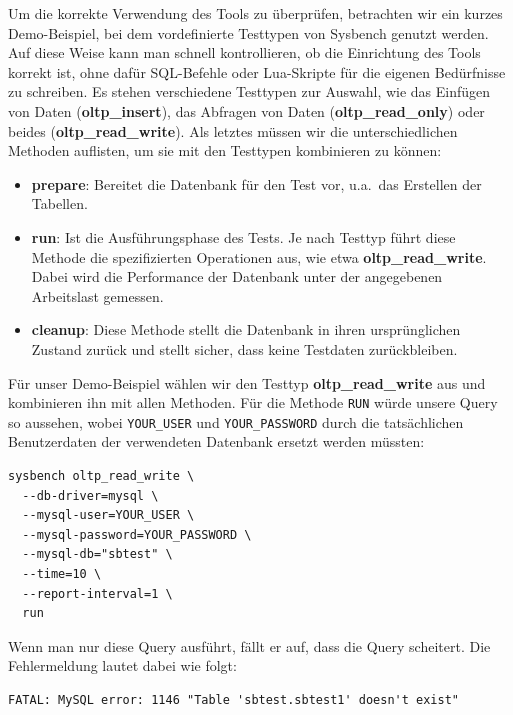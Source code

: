 Um die korrekte Verwendung des Tools zu überprüfen, betrachten wir ein kurzes Demo-Beispiel, bei dem vordefinierte Testtypen von Sysbench genutzt werden.
Auf diese Weise kann man schnell kontrollieren, ob die Einrichtung des Tools korrekt ist, ohne dafür SQL-Befehle oder Lua-Skripte für die eigenen Bedürfnisse zu schreiben.
Es stehen verschiedene Testtypen zur Auswahl, wie das Einfügen von Daten (\textbf{oltp\_insert}), das Abfragen von Daten (\textbf{oltp\_read\_only}) oder beides (\textbf{oltp\_read\_write}).
Als letztes müssen wir die unterschiedlichen Methoden auflisten, um sie mit den Testtypen kombinieren zu können:

\begin{itemize}
    \setlength{\itemsep}{-3pt}
    \item \textbf{prepare}: Bereitet die Datenbank für den Test vor, u.a.\ das Erstellen der Tabellen.
    \item \textbf{run}: Ist die Ausführungsphase des Tests.
    Je nach Testtyp führt diese Methode die spezifizierten Operationen aus, wie etwa \textbf{oltp\_read\_write}.
    Dabei wird die Performance der Datenbank unter der angegebenen Arbeitslast gemessen.
    \item \textbf{cleanup}: Diese Methode stellt die Datenbank in ihren ursprünglichen Zustand zurück und stellt sicher, dass keine Testdaten zurückbleiben.
\end{itemize}

Für unser Demo-Beispiel wählen wir den Testtyp \textbf{oltp\_read\_write} aus und kombinieren ihn mit allen Methoden.
Für die Methode \texttt{RUN} würde unsere Query so aussehen, wobei \texttt{YOUR\_USER} und \texttt{YOUR\_PASSWORD} durch die tatsächlichen Benutzerdaten der verwendeten Datenbank ersetzt werden müssten:

\vspace{-5pt}
\begin{lstlisting}[style=custom_daniel,label={lst:tools-sysbench-run}]
sysbench oltp_read_write \
  --db-driver=mysql \
  --mysql-user=YOUR_USER \
  --mysql-password=YOUR_PASSWORD \
  --mysql-db="sbtest" \
  --time=10 \
  --report-interval=1 \
  run
\end{lstlisting}
\vspace{-5pt}

Wenn man nur diese Query ausführt, fällt er auf, dass die Query scheitert.
Die Fehlermeldung lautet dabei wie folgt:

\begin{lstlisting}[style=custom_daniel,label={lst:tools-error-without-prepare}]
FATAL: MySQL error: 1146 "Table 'sbtest.sbtest1' doesn't exist"
\end{lstlisting}

